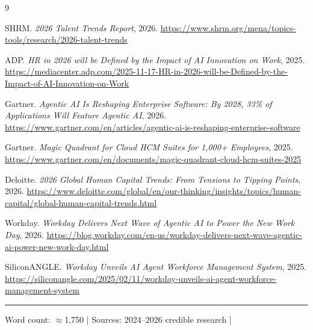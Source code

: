 \documentclass[12pt, a4paper]{article}
\begin{document}

\begin{thebibliography}{9}

 SHRM.
\textit{2026 Talent Trends Report}, 2026.
\url{https://www.shrm.org/mena/topics-tools/research/2026-talent-trends}

 ADP.
\textit{HR in 2026 will be Defined by the Impact of AI Innovation on Work}, 2025.
\url{https://mediacenter.adp.com/2025-11-17-HR-in-2026-will-be-Defined-by-the-Impact-of-AI-Innovation-on-Work}

 Gartner.
\textit{Agentic AI Is Reshaping Enterprise Software: By 2028, 33\% of Applications Will Feature Agentic AI}, 2026.
\url{https://www.gartner.com/en/articles/agentic-ai-is-reshaping-enterprise-software}

 Gartner.
\textit{Magic Quadrant for Cloud HCM Suites for 1,000+ Employees}, 2025.
\url{https://www.gartner.com/en/documents/magic-quadrant-cloud-hcm-suites-2025}

 Deloitte.
\textit{2026 Global Human Capital Trends: From Tensions to Tipping Points}, 2026.
\url{https://www.deloitte.com/global/en/our-thinking/insights/topics/human-capital/global-human-capital-trends.html}

 Workday.
\textit{Workday Delivers Next Wave of Agentic AI to Power the New Work Day}, 2026.
\url{https://blog.workday.com/en-us/workday-delivers-next-wave-agentic-ai-power-new-work-day.html}

 SiliconANGLE.
\textit{Workday Unveils AI Agent Workforce Management System}, 2025.
\url{https://siliconangle.com/2025/02/11/workday-unveils-ai-agent-workforce-management-system}

\end{thebibliography}

\vspace{12pt}
\noindent\rule{\linewidth}{0.4pt}
\vspace{4pt}

\begin{center}
  \small\color{midgray}
  Word count: $\approx$1{,}750 \quad|\quad
  Sources: 2024--2026 credible research \quad|\quad
\end{center}
\end{document}
